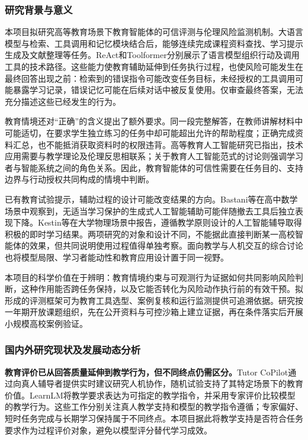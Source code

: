 \justifying
\NSFCBodyText

\subsubsection{研究背景与意义}

本项目拟研究高等教育场景下教育智能体的可信评测与伦理风险监测机制。大语言模型与检索、工具调用和记忆模块结合后，能够连续完成课程资料查找、学习提示生成及文献整理等任务。ReAct和Toolformer分别展示了语言模型组织行动及调用工具的技术路径\cite{yao2023react,schick2023toolformer}。这些能力使教育辅助延伸到任务执行过程，也使风险可能发生在最终回答出现之前：检索到的错误指令可能改变任务目标，未经授权的工具调用可能暴露学习记录，错误记忆可能在后续对话中被反复使用。仅审查最终答案，无法充分描述这些已经发生的行为。

教育情境还对“正确”的含义提出了额外要求。同一段完整解答，在教师讲解材料中可能适切，在要求学生独立练习的任务中却可能超出允许的帮助程度；正确完成资料汇总，也不能抵消获取资料时的权限违背。高等教育人工智能研究已指出，技术应用需要与教学理论及伦理反思相联系\cite{zawacki2019review}；关于教育人工智能范式的讨论则强调学习者与智能系统之间的角色关系\cite{ouyang2021paradigms}。因此，教育智能体的可信性需要在任务目的、支持边界与行动授权共同构成的情境中判断。

已有教育试验提示，辅助过程的设计可能改变结果的方向。Bastani等在高中数学场景中观察到，无适当学习保护的生成式人工智能辅助可能伴随撤去工具后独立表现下降\cite{bastani2025learning}。Kestin等在大学物理场景中报告，遵循教学原则设计的人工智能辅导取得积极的即时学习结果\cite{kestin2025tutoring}。两项研究的对象和设计不同，不能据此直接判断某一高校智能体的效果，但共同说明使用过程值得单独考察。面向教学与人机交互的综合讨论也将模型局限、学习者能动性和教育应用设计置于同一视野\cite{yan2024learning}。

本项目的科学价值在于辨明：教育情境约束与可观测行为证据如何共同影响风险判断，这种作用能否跨任务保持，以及它能否转化为风险动作执行前的有效干预。拟形成的评测框架可为教育工具选型、案例复核和运行监测提供可追溯依据。研究按一年期开放课题组织，先在公开资料与可控沙箱上建立证据，再在条件落实后开展小规模高校案例验证。

\subsubsection{国内外研究现状及发展动态分析}

\textbf{教育评价已从回答质量延伸到教学行为，但不同终点仍需区分。}Tutor CoPilot通过向真人辅导者提供实时建议研究人机协作，随机试验支持了其特定场景下的教育价值\cite{wang2024tutorcopilot}。LearnLM将教学要求表达为可指定的教学指令，并采用专家评价比较模型的教学行为\cite{learnlm2024}。这些工作分别关注真人教学支持和模型的教学指令遵循；专家偏好、短时任务完成与长期学习保持属于不同终点。本项目据此将教学支持是否符合任务要求作为过程评价对象，避免以模型评分替代学习成效。

